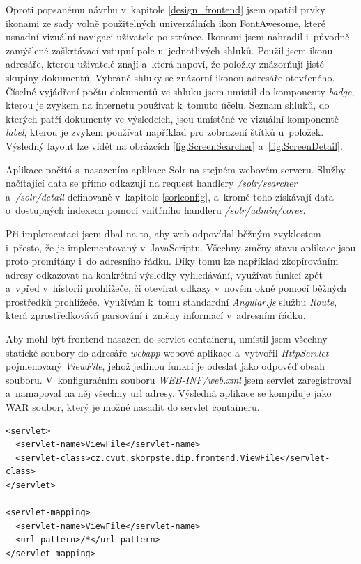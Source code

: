 Oproti popsanému návrhu v~kapitole \ref{design_frontend} jsem opatřil prvky ikonami ze sady volně použitelných univerzálních ikon FontAwesome\cite{fontawesome}, které usnadní vizuální navigaci uživatele po stránce. Ikonami jsem nahradil i~původně zamýšlené zaškrtávací vstupní pole u~jednotlivých shluků. Použil jsem ikonu adresáře, kterou uživatelé znají a~která napoví, že položky znázorňují jisté skupiny dokumentů. Vybrané shluky se znázorní ikonou adresáře otevřeného. Číselné vyjádření počtu dokumentů ve shluku jsem umístil do komponenty \emph{badge}, kterou je zvykem na internetu používat k~tomuto účelu. Seznam shluků, do kterých patří dokumenty ve výsledcích, jsou umístěné ve vizuální komponentě \emph{label}, kterou je zvykem používat například pro zobrazení štítků u~položek. Výsledný layout lze vidět na obrázcích \ref{fig:ScreenSearcher} a~\ref{fig:ScreenDetail}.

Aplikace počítá s~nasazením aplikace Solr na stejném webovém serveru. Služby načítající data se přímo odkazují na request handlery \emph{/solr/searcher} a~\emph{/solr/detail} definované v~kapitole \ref{sorlconfig}, a~kromě toho získávají data o~dostupných indexech pomocí vnitřního handleru \emph{/solr/admin/cores}.

Při implementaci jsem dbal na to, aby web odpovídal běžným zvyklostem i~přesto, že je implementovaný v~JavaScriptu. Všechny změny stavu aplikace jsou proto promítány i~do adresního řádku. Díky tomu lze například zkopírováním adresy odkazovat na konkrétní výsledky vyhledávání, využívat funkcí zpět a~vpřed v~historii prohlížeče, či otevírat odkazy v~novém okně pomocí běžných prostředků prohlížeče. Využívám k~tomu standardní \emph{Angular.js} službu \emph{Route}, která zprostředkovává parsování i~změny informací v~adresním řádku.

Aby mohl být frontend nasazen do servlet containeru, umístil jsem všechny statické soubory do adresáře \emph{webapp} webové aplikace a~vytvořil \emph{HttpServlet} pojmenovaný \emph{ViewFile}, jehož jedinou funkcí je odeslat jako odpověď obsah souboru. V~konfiguračním souboru \emph{WEB-INF/web.xml} jsem servlet zaregistroval a~namapoval na něj všechny url adresy. Výsledná aplikace se kompiluje jako WAR soubor, který je možné nasadit do servlet containeru.

\begin{verbatim}
<servlet>
  <servlet-name>ViewFile</servlet-name>
  <servlet-class>cz.cvut.skorpste.dip.frontend.ViewFile</servlet-class>
</servlet>

<servlet-mapping>
  <servlet-name>ViewFile</servlet-name>
  <url-pattern>/*</url-pattern>
</servlet-mapping>
\end{verbatim}

